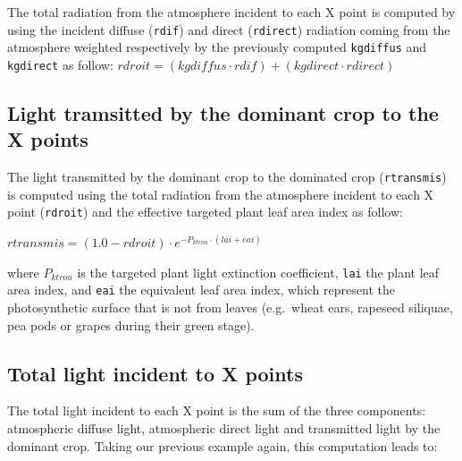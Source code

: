 \documentclass[]{book}
\theoremstyle{definition}
\theoremstyle{definition}
\theoremstyle{definition}
\theoremstyle{remark}
\begin{document}
The total radiation from the atmosphere incident to each X point is
computed by using the incident diffuse (\texttt{rdif}) and direct
(\texttt{rdirect}) radiation coming from the atmosphere weighted
respectively by the previously computed \texttt{kgdiffus} and
\texttt{kgdirect} as follow:
\(rdroit=(kgdiffus\cdot rdif)+(kgdirect\cdot rdirect)\)

\subsection{Light tramsitted by the dominant crop to the X
points}\label{light-tramsitted-by-the-dominant-crop-to-the-x-points}

The light transmitted by the dominant crop to the dominated crop
(\texttt{rtransmis}) is computed using the total radiation from the
atmosphere incident to each X point (\texttt{rdroit}) and the effective
targeted plant leaf area index as follow:

\(rtransmis=(1.0-rdroit)\cdot e^{-P_{ktrou}\cdot(lai+eai)}\)

where \(P_{ktrou}\) is the targeted plant light extinction coefficient,
\texttt{lai} the plant leaf area index, and \texttt{eai} the equivalent
leaf area index, which represent the photosynthetic surface that is not
from leaves (e.g.~wheat ears, rapeseed siliquae, pea pods or grapes
during their green stage).

\subsection{Total light incident to X
points}\label{total-light-incident-to-x-points}

The total light incident to each X point is the sum of the three
components: atmospheric diffuse light, atmospheric direct light and
transmitted light by the dominant crop. Taking our previous example
again, this computation leads to:
\end{document}
